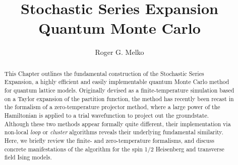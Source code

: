 \documentclass[vecphys]{svmult}
\begin{document}
\title{Stochastic Series Expansion Quantum Monte Carlo}
\author{Roger G. Melko}

\maketitle

\begin{abstract}
This 	Chapter outlines the fundamental construction of the Stochastic Series Expansion, a highly efficient and easily implementable quantum Monte Carlo method for quantum lattice models.
Originally devised as a finite-temperature simulation based on a Taylor expansion of the partition function, the method has recently been 
recast in the formalism of a zero-temperature projector method, where a large power of the Hamiltonian is applied to a trial wavefunction to project out the groundstate.  Although these two methods appear formally quite different, their implementation via non-local \textit{loop} or \textit{cluster} algorithms reveals their underlying fundamental similarity.  Here, we briefly review the finite- and zero-temperature formalisms, and discuss concrete manifestations of the algorithm for the spin 1/2 Heisenberg and transverse field Ising models.
\end{abstract}

\end{document}
